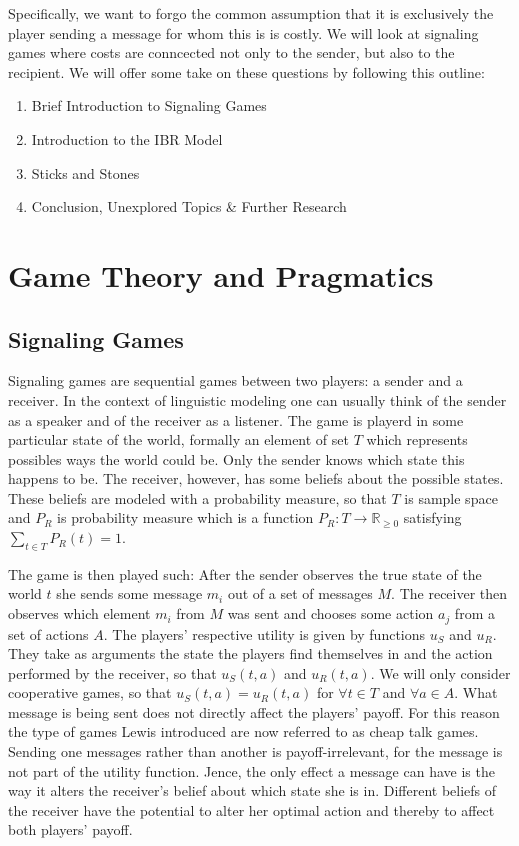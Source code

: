 \documentclass[10]{article}
\begin{document}
Specifically, we want to forgo the common assumption that it is exclusively the player sending a message for whom this is is costly. We will look at signaling games where costs are conncected not only to the sender, but also to the recipient.
We will offer some take on these questions by following this outline:
\begin{enumerate} %
\item Brief Introduction to Signaling Games
\item Introduction to the IBR Model
\item Sticks and Stones
\item Conclusion, Unexplored Topics \& Further Research
\end{enumerate}

\section{Game Theory and Pragmatics}
\subsection{Signaling Games}
Signaling games are sequential games between two players: a sender and a receiver. In the context of linguistic modeling one can usually think of the sender as a speaker and of the receiver as a listener. The game is playerd in some particular state of the world, formally an element of set $T$ which represents possibles ways the world could be. Only the sender knows which state this happens to be. The receiver, however, has some beliefs about the possible states. These beliefs are modeled with a probability measure, so that $T$ is sample space and $P_R$ is probability measure which is a function $P_R: T\rightarrow \mathbb{R}_{\geq 0}$ satisfying $\sum_{t\in T}P_R(t)=1$.

The game is then played such: After the sender observes the true state of the world $t$ she sends some message $m_i$ out of a set of messages $M$.
The receiver then observes which element $m_i$ from $M$ was sent and chooses some action $a_j$ from a set of actions $A$.
The players' respective utility is given by functions $u_S$ and $u_R$. They take as arguments the state the players find themselves in and the action performed by the receiver, so that $u_S(t,a)$ and $u_R(t,a)$. We will only consider cooperative games, so that $u_S(t,a)=u_R(t,a)$ for $\forall t\in T$ and $\forall a\in A$.
What message is being sent does not directly affect the players' payoff. For this reason the type of games Lewis introduced are now referred to as cheap talk games. Sending one messages rather than another is payoff-irrelevant, for the message is not part of the utility function. Jence, the only effect a message can have is the way it alters the receiver's belief about which state she is in. Different beliefs of the receiver have the potential to alter her optimal action and thereby to affect both players' payoff.
\end{document}
